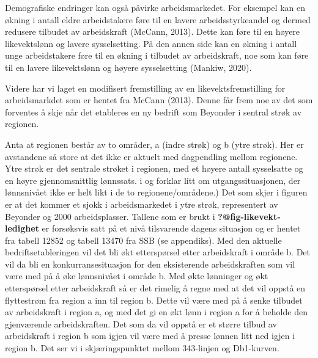 \documentclass[
]{article}
\begin{document}
Demografiske endringer kan også påvirke arbeidsmarkedet. For eksempel
kan en økning i antall eldre arbeidstakere føre til en lavere
arbeidsstyrkeandel og dermed redusere tilbudet av arbeidskraft (McCann,
2013). Dette kan føre til en høyere likevektslønn og lavere
sysselsetting. På den annen side kan en økning i antall unge
arbeidstakere føre til en økning i tilbudet av arbeidskraft, noe som kan
føre til en lavere likevektslønn og høyere sysselsetting (Mankiw, 2020).

Videre har vi laget en modifisert fremstilling av en
likevektsfremstilling for arbeidsmarkdet som er hentet fra McCann
(2013). Denne får frem noe av det som forventes å skje når det etableres
en ny bedrift som Beyonder i sentral strøk av regionen.

Anta at regionen består av to områder, a (indre strøk) og b (ytre
strøk). Her er avstandene så store at det ikke er aktuelt med
dagpendling mellom regionene. Ytre strøk er det sentrale strøket i
regionen, med et høyere antall sysselsatte og en høyre gjennomsnittlig
lønnssats. i og forklar litt om utgangssituasjonen, der lønnsnivået ikke
er helt likt i de to regionene/områdene.) Det som skjer i figuren er at
det kommer et sjokk i arbeidsmarkedet i ytre strøk, representert av
Beyonder og 2000 arbeidsplasser. Tallene som er brukt i
\textbf{?@fig-likevekt-ledighet} er forsøksvis satt på et nivå
tilsvarende dagens situasjon og er hentet fra tabell 12852 og tabell
13470 fra SSB (se appendiks). Med den aktuelle bedriftsetableringen vil
det bli økt etterspørsel etter arbeidskraft i område b. Det vil da bli
en konkurransesituasjon for den eksisterende arbeidskraften som vil være
med på å øke lønnsnivået i område b. Med økte lønninger og økt
etterspørsel etter arbeidskraft så er det rimelig å regne med at det vil
oppstå en flyttestrøm fra region a inn til region b. Dette vil være med
på å senke tilbudet av arbeidskraft i region a, og med det gi en økt
lønn i region a for å beholde den gjenværende arbeidskraften. Det som da
vil oppstå er et større tilbud av arbeidskraft i region b som igjen vil
være med å presse lønnen litt ned igjen i region b. Det ser vi i
skjæringspunktet mellom 343-linjen og Db1-kurven.
\end{document}

